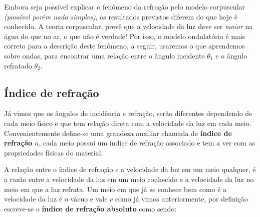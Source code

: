 Embora seja possível explicar o fenômeno da refração pelo modelo corpuscular \emph{(possível porém nada simples)}, os resultados previstos diferem do que hoje é conhecido. A teoria corpuscular, prevê que a velocidade da luz deve ser \emph{maior} na água do que no ar, o que não é verdade! Por isso, o modelo ondulatório é mais correto para a descrição deste fenômeno, a seguir, usaremos o que aprendemos sobre ondas, para encontrar uma relação entre o ângulo incidente $\theta_1$ e o ângulo refratado $\theta_2$.


\subsection*{Índice de refração}        

Já vimos que os ângulos de incidência e refração, serão diferentes dependendo de cada meio físico e que tem relação direta com a velocidade da luz em cada meio. Convenientemente define-se uma grandeza auxiliar chamada de \textbf{índice de refração} $n$, cada meio possui um índice de refração associado e tem a ver com as propriedades físicas do material.

A relação entre o índice de refração e a velocidade da luz em um meio qualquer, é a razão entre a velocidade da luz em um meio conhecido e a velocidade da luz no meio em que a luz refrata. Um meio em que já se conhece bem como é a velocidade da luz é o vácuo e vale $c$ como já vimos anteriormente, por definição escreve-se o \textbf{índice de refração absoluto} como sendo:

